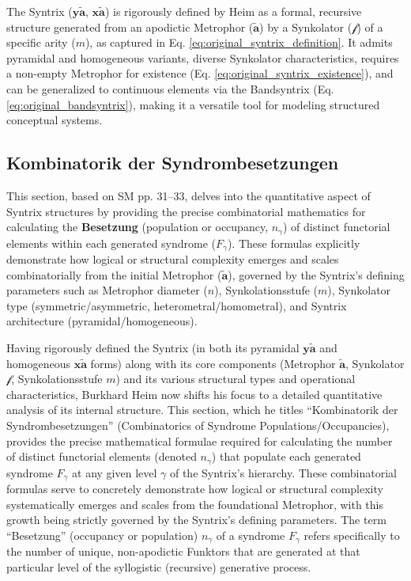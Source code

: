 \documentclass[12pt]{article}
\newcommand{\q}[1]{\enquote{#1}}
\newcommand{\syntrix}{\bm{y\widetilde{a}}}
\newcommand{\homogeneoussyntrix}{\bm{x\widetilde{a}}}
\newcommand{\metrophor}{\bm{\widetilde{a}}}
\newcommand{\synkolator}{\mathcal{f}}
\newcommand{\synkolationsstufe}{m}
\newcommand{\syndrom}{F}
\begin{document}
The Syntrix (\(\syntrix\), \(\homogeneoussyntrix\)) is rigorously defined by Heim as a formal, recursive structure generated from an apodictic Metrophor (\(\metrophor\)) by a Synkolator (\(\synkolator\)) of a specific arity (\(\synkolationsstufe\)), as captured in Eq. \eqref{eq:original_syntrix_definition}. It admits pyramidal and homogeneous variants, diverse Synkolator characteristics, requires a non-empty Metrophor for existence (Eq. \eqref{eq:original_syntrix_existence}), and can be generalized to continuous elements via the Bandsyntrix (Eq. \eqref{eq:original_bandsyntrix}), making it a versatile tool for modeling structured conceptual systems.

\subsection{Kombinatorik der Syndrombesetzungen}
\label{sec:kombinatorik}

This section, based on SM pp. 31--33, delves into the quantitative aspect of Syntrix structures by providing the precise combinatorial mathematics for calculating the \textbf{Besetzung} (population or occupancy, \(n_\gamma\)) of distinct functorial elements within each generated syndrome (\(\syndrom_\gamma\)). These formulas explicitly demonstrate how logical or structural complexity emerges and scales combinatorially from the initial Metrophor (\(\metrophor\)), governed by the Syntrix's defining parameters such as Metrophor diameter (\(n\)), Synkolationsstufe (\(\synkolationsstufe\)), Synkolator type (symmetric/asymmetric, heterometral/homometral), and Syntrix architecture (pyramidal/homogeneous).

Having rigorously defined the Syntrix (in both its pyramidal \( \syntrix \) and homogeneous \( \homogeneoussyntrix \) forms) along with its core components (Metrophor \( \metrophor \), Synkolator \( \synkolator \), Synkolationsstufe \( \synkolationsstufe \)) and its various structural types and operational characteristics, Burkhard Heim now shifts his focus to a detailed quantitative analysis of its internal structure. This section, which he titles \q{Kombinatorik der Syndrombesetzungen} (Combinatorics of Syndrome Populations/Occupancies), provides the precise mathematical formulae required for calculating the number of distinct functorial elements (denoted \( n_\gamma \)) that populate each generated syndrome \( \syndrom_\gamma \) at any given level \( \gamma \) of the Syntrix's hierarchy. These combinatorial formulas serve to concretely demonstrate how logical or structural complexity systematically emerges and scales from the foundational Metrophor, with this growth being strictly governed by the Syntrix's defining parameters. The term \q{Besetzung} (occupancy or population) \( n_\gamma \) of a syndrome \( \syndrom_\gamma \) refers specifically to the number of unique, non-apodictic Funktors that are generated at that particular level of the syllogistic (recursive) generative process.
\end{document}
